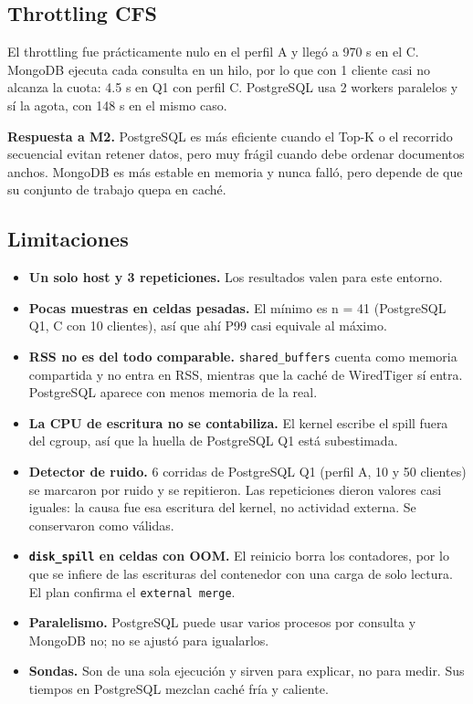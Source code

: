 \documentclass[11pt,letterpaper]{article}
\newcommand{\code}[1]{\texttt{#1}}
\begin{document}
\subsection{Throttling CFS}

El throttling fue prácticamente nulo en el perfil A y llegó a 970 s en el C. MongoDB ejecuta cada consulta en un hilo, por lo que con 1 cliente casi no alcanza la cuota: 4.5 s en Q1 con perfil C. PostgreSQL usa 2 workers paralelos y sí la agota, con 148 s en el mismo caso.

\textbf{Respuesta a M2.} PostgreSQL es más eficiente cuando el Top-K o el recorrido secuencial evitan retener datos, pero muy frágil cuando debe ordenar documentos anchos. MongoDB es más estable en memoria y nunca falló, pero depende de que su conjunto de trabajo quepa en caché.

\subsection{Limitaciones}

\begin{itemize}
\item \textbf{Un solo host y 3 repeticiones.} Los resultados valen para este entorno.
\item \textbf{Pocas muestras en celdas pesadas.} El mínimo es n = 41 (PostgreSQL Q1, C con 10 clientes), así que ahí P99 casi equivale al máximo.
\item \textbf{RSS no es del todo comparable.} \code{shared\_\allowbreak{}buffers} cuenta como memoria compartida y no entra en RSS, mientras que la caché de WiredTiger sí entra. PostgreSQL aparece con menos memoria de la real.
\item \textbf{La CPU de escritura no se contabiliza.} El kernel escribe el spill fuera del cgroup, así que la huella de PostgreSQL Q1 está subestimada.
\item \textbf{Detector de ruido.} 6 corridas de PostgreSQL Q1 (perfil A, 10 y 50 clientes) se marcaron por ruido y se repitieron. Las repeticiones dieron valores casi iguales: la causa fue esa escritura del kernel, no actividad externa. Se conservaron como válidas.
\item \textbf{\code{disk\_\allowbreak{}spill} en celdas con OOM.} El reinicio borra los contadores, por lo que se infiere de las escrituras del contenedor con una carga de solo lectura. El plan confirma el \code{external merge}.
\item \textbf{Paralelismo.} PostgreSQL puede usar varios procesos por consulta y MongoDB no; no se ajustó para igualarlos.
\item \textbf{Sondas.} Son de una sola ejecución y sirven para explicar, no para medir. Sus tiempos en PostgreSQL mezclan caché fría y caliente.
\end{itemize}
\end{document}

